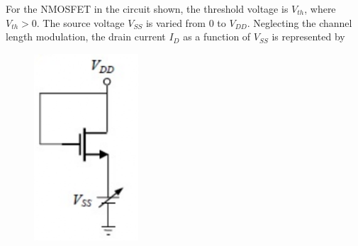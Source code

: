     \item For the NMOSFET in the circuit shown, the threshold voltage is $V_{th}$, where $V_{th}>0$. The source voltage $V_{SS}$ is varied from 0 to $V_{DD}$. Neglecting the channel length modulation, the drain current $I_{D}$ as a function of $V_{SS}$ is represented by
    \begin{figure}[H]
        \centering
        \includegraphics[width=0.3\columnwidth]{figs/q49.png}
        \caption*{}
        \label{fig:q49}
    \end{figure}
